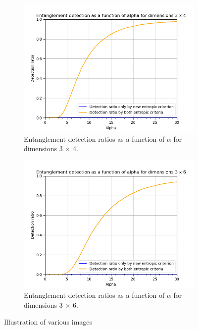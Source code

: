 \begin{figure}[ht]
\begin{subfigure}[b]{0.5\linewidth}
    \label{fig:renyi_3x3} 
    \vspace{2ex}
  \end{subfigure} 
  \begin{subfigure}[b]{0.5\linewidth}
    \centering
    \includegraphics[width=\linewidth]{images/renyi_comparison_3_4_30_0.2.png} 
    \caption{Entanglement detection ratios as a function of $\alpha$ for dimensions 3 $\times$ 4.} 
    \label{fig:renyi_3x4} 
  \end{subfigure}%
  \begin{subfigure}[b]{0.5\linewidth}
    \centering
    \includegraphics[width=\linewidth]{images/renyi_comparison_3_6_30_0.2.png} 
    \caption{Entanglement detection ratios as a function of $\alpha$ for dimensions 3 $\times$ 6.} 
    \label{fig:renyi_3x6} 
  \end{subfigure} 
  \caption{Illustration of various images}
  \label{fig:renyi_comparison} 
\end{figure}



